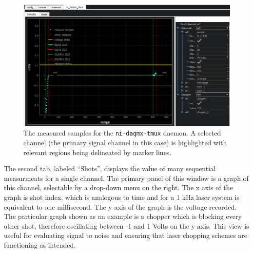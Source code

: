 \begin{landscape}
\begin{figure}
\includegraphics[width=8in]{"yaq/images/ni_daq_samples"}
\caption[\yaqcqtpy{} NI DAQmx Tmux Plugin (samples)]{
	The measured samples for the \texttt{ni-daqmx-tmux} daemon.
	A selected channel (the primary signal channel in this case) is highlighted with relevant regions being delineated by marker lines.
}
\label{yaq:fig:ni_daq_samples}
\end{figure}
\end{landscape}

The second tab, labeled ``Shots'', displays the value of many sequential measurments for a single channel.
The primary panel of this window is a graph of this channel, selectable by a drop-down menu on the right.
The x axis of the graph is shot index, which is analogous to time and for a 1 kHz laser system is equivalent to one millisecond.
The y axis of the graph is the voltage recorded.
The particular graph shown as an example is a chopper which is blocking every other shot, therefore oscillating between -1 and 1 Volts on the y axis.
This view is useful for evaluating signal to noise and ensuring that laser chopping schemes are functioning as intended.

